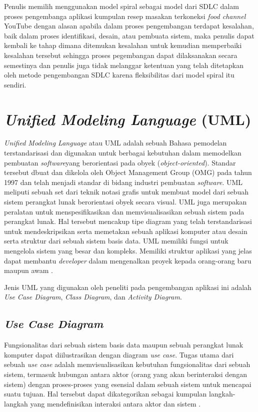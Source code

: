 	Penulis memilih menggunakan model spiral sebagai model dari SDLC dalam proses pengembanga aplikasi kumpulan resep masakan terkoneksi \textit{food channel} YouTube dengan alasan apabila dalam proses pengembangan terdapat kesalahan, baik dalam proses identifikasi, desain, atau pembuata sistem, maka penulis dapat kembali ke tahap dimana ditemukan kesalahan untuk kemudian memperbaiki kesalahan tersebut sehingga proses pegembangan dapat dilaksanakan secara semestinya dan penulis juga tidak melanggar ketentuan yang telah ditetapkan oleh metode pengembangan SDLC karena fleksibilitas dari model spiral itu sendiri.

\section{\emph{Unified Modeling Language} (UML)}
	\emph{Unified Modeling Language} atau UML adalah sebuah Bahasa pemodelan terstandarisasi dan digunakan untuk berbagai kebutuhan dalam memodelkan pembuatan \emph{software}yang berorientasi pada obyek (\emph{object-oriented}). Standar tersebut dbuat dan dikelola oleh Object Management Group (OMG) pada tahun 1997 dan telah menjadi standar di bidang industri pembuatan \emph{software}. UML meliputi sebuah set dari teknik notasi grafis untuk membuat model dari sebuah sistem perangkat lunak berorientasi obyek secara visual. UML juga merupakan peralatan untuk menspesifikasikan dan memvisualisasikan sebuah sistem pada perangkat lunak. Hal tersebut mencakup tipe diagram yang telah terstandarisasi untuk mendeskripsikan serta memetakan sebuah aplikasi komputer atau desain serta struktur dari sebuah sistem basis data. UML memiliki fungsi untuk mengelola sistem yang besar dan kompleks. Memiliki struktur aplikasi yang jelas dapat membantu \emph{developer} dalam mengenalkan proyek kepada orang-orang baru maupun awam \cite{lee}.
	
	Jenis UML yang digunakan oleh peneliti pada pengembangan aplikasi ini adalah \emph{Use Case Diagram}, \emph{Class Diagram}, dan \emph{Activity Diagram}.
	
	\subsection{\emph{Use Case Diagram}}
		Fungsionalitas dari sebuah sistem basis data maupun sebuah perangkat lunak komputer dapat diilustrasikan dengan diagram \emph{use case}. Tugas utama dari sebuah \emph{use case} adalah memvisualisasikan kebutuhan fungsionalitas dari sebuah sistem, termasuk hubungan antara aktor (orang yang akan berinteraksi dengan sistem) dengan proses-proses yang esensial dalam sebuah sistem untuk mencapai suatu tujuan. Hal tersebut dapat dikategorikan sebagai kumpulan langkah-langkah yang mendefinisikan interaksi antara aktor dan sistem \cite{bell}.  
		

